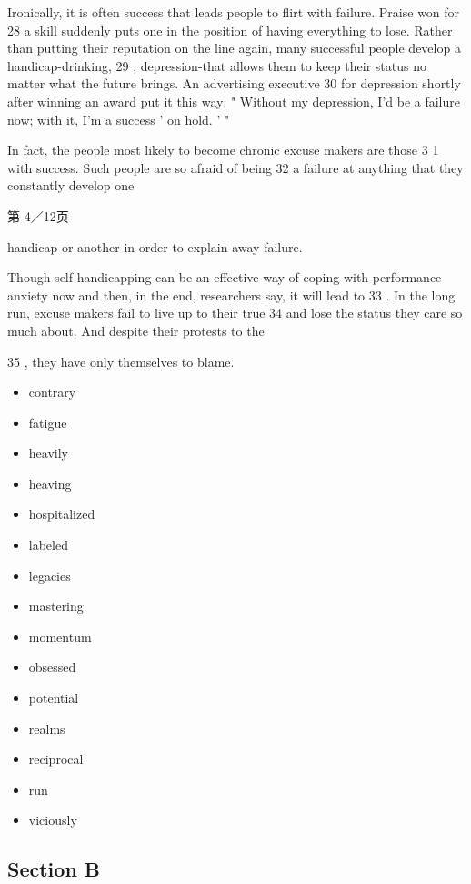 \documentclass[UTF8,11pt]{ctexart}
\begin{document}
Ironically, it is often success that leads people to flirt with failure. Praise won for 28 a skill suddenly puts one in the position of having everything to lose. Rather than putting their reputation on the line again, many successful people develop a handicap-drinking, 29 , depression-that allows them to keep their status no matter what the future brings. An advertising executive 30 for depression shortly after winning an award put it this way: " Without my depression, I'd be a failure now; with it, I'm a success ' on hold. ' "


In fact, the people most likely to become chronic excuse makers are those 3 1 with success. Such people are so afraid of being 32 a failure at anything that they constantly develop one


第 4／12页


handicap or another in order to explain away failure.


Though self-handicapping can be an effective way of coping with performance anxiety now and then, in the end, researchers say, it will lead to 33 . In the long run, excuse makers fail to live up to their true 34 and lose the status they care so much about. And despite their protests to the


35 , they have only themselves to blame.


\begin{itemize}[leftmargin=2em,itemsep=.2em,topsep=.4em]\item[A.] contrary
\item[B.] fatigue
\item[C.] heavily
\item[D.] heaving
\item[E.] hospitalized
\item[F.] labeled
\item[G.] legacies
\item[H.] mastering
\item[I.] momentum
\item[J.] obsessed
\item[K.] potential
\item[L.] realms
\item[M.] reciprocal
\item[N.] run
\item[O.] viciously
\end{itemize}

\subsection*{\textbf{Section B}}
\end{document}
